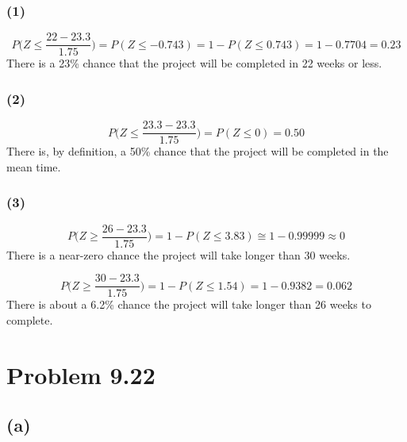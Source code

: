 \documentclass{article}
\begin{document}
	\subsubsection*{(1)}
	\begin{equation*}
		P\bigg(Z\le \frac{22-23.3}{1.75}\bigg) = P(Z \le -0.743) = 1 - P(Z \le 0.743) = 1 - 0.7704 = 0.23
	\end{equation*}
	There is a 23\% chance that the project will be completed in 22 weeks or less.
	
	\subsubsection*{(2)}
	\begin{equation*}
		P\bigg(Z\le \frac{23.3-23.3}{1.75}\bigg) = P(Z \le 0) = 0.50
	\end{equation*}
	There is, by definition, a 50\% chance that the project will be completed in the mean time.
	
	\subsubsection*{(3)}
	\begin{equation*}
		P\bigg(Z\ge \frac{26-23.3}{1.75}\bigg) = 1 - P(Z \le 3.83) \cong 1 - 0.99999 \approx 0
	\end{equation*}
	There is a near-zero chance the project will take longer than 30 weeks.
	
	\begin{equation*}
		P\bigg(Z\ge \frac{30-23.3}{1.75}\bigg) = 1 - P(Z \le 1.54) = 1 - 0.9382 = 0.062
	\end{equation*}
	There is about a 6.2\% chance the project will take longer than 26 weeks to complete.
	\section*{Problem 9.22}
	
	\subsection*{(a)}
	\begin{center}
	\makebox[\textwidth]{
		}
	\end{center}	
	
	\pagebreak
	
\end{document}
